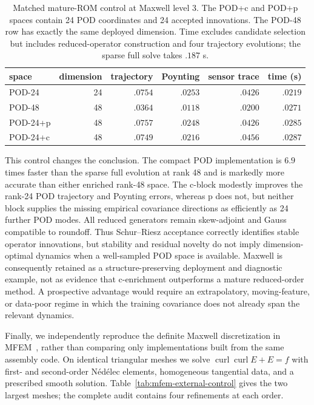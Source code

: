 \documentclass[11pt]{article}
\numberwithin{algorithm}{section}
\theoremstyle{definition}\newtheorem{definition}[theorem]{Definition}
\theoremstyle{remark}\newtheorem{remark}[theorem]{Remark}
\begin{document}
\begin{table}[H]
\centering
\caption{Matched mature-ROM control at Maxwell level 3.  The POD+c and POD+p
spaces contain 24 POD coordinates and 24 accepted innovations.  The POD-48
row has exactly the same deployed dimension.  Time excludes candidate
selection but includes reduced-operator construction and four trajectory
evolutions; the sparse full solve takes $.187$ s.}
\label{tab:maxwell-pod-control}
\begin{tabular}{lrrrrr}
\toprule
space & dimension & trajectory & Poynting & sensor trace & time (s)\\
\midrule
POD-24   & 24 & $.0754$ & $.0253$ & $.0426$ & $.0219$\\
POD-48   & 48 & $\mathbf{.0364}$ & $\mathbf{.0118}$ & $\mathbf{.0200}$ & $.0271$\\
POD-24+p & 48 & $.0757$ & $.0248$ & $.0426$ & $.0285$\\
POD-24+c & 48 & $.0749$ & $.0216$ & $.0456$ & $.0287$\\
\bottomrule
\end{tabular}
\end{table}

This control changes the conclusion.  The compact POD implementation is
$6.9$ times faster than the sparse full evolution at rank 48 and is markedly
more accurate than either enriched rank-48 space.  The c-block modestly
improves the rank-24 POD trajectory and Poynting errors, whereas p does not,
but neither block supplies the missing empirical covariance directions as
efficiently as 24 further POD modes.  All reduced generators remain
skew-adjoint and Gauss compatible to roundoff.  Thus Schur--Riesz acceptance
correctly identifies stable operator innovations, but stability and residual
novelty do not imply dimension-optimal dynamics when a well-sampled POD space
is available.  Maxwell is consequently retained as a structure-preserving
deployment and diagnostic example, not as evidence that c-enrichment
outperforms a mature reduced-order method.  A prospective advantage would
require an extrapolatory, moving-feature, or data-poor regime in which the
training covariance does not already span the relevant dynamics.

Finally, we independently reproduce the definite Maxwell discretization in
MFEM~\cite{anderson2021mfem}, rather than comparing only implementations built
from the same assembly code.  On identical triangular meshes we solve
$\operatorname{curl}\operatorname{curl}E+E=f$ with first- and second-order
N\'ed\'elec elements, homogeneous tangential data, and a prescribed smooth
solution.  Table~\ref{tab:mfem-external-control} gives the two largest meshes;
the complete audit contains four refinements at each order.
\end{document}

